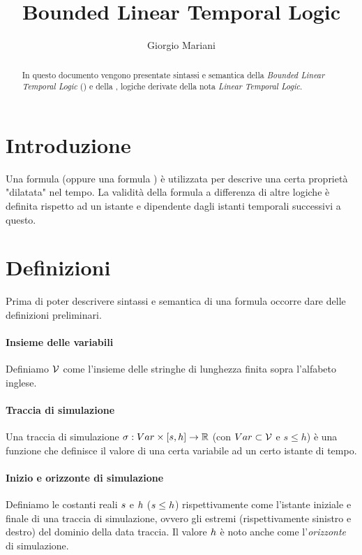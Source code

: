 \documentclass[10pt,a4paper]{article}
\author{Giorgio Mariani}
\date{}
\title{Bounded Linear Temporal Logic}
\begin{document}
	\maketitle{}
	
	\begin{abstract}
	In questo documento vengono presentate sintassi e semantica della \emph{Bounded Linear Temporal Logic} (\BLTL{}) e della \BLTLstar{}, logiche derivate della nota \emph{Linear Temporal Logic}.
	\end{abstract}
	
	\section{Introduzione}
	Una formula \BLTL{} (oppure una formula \BLTLstar) è utilizzata per descrive una certa proprietà "dilatata" nel tempo.
	La validità della formula a differenza di altre logiche è definita rispetto ad un istante e dipendente dagli istanti temporali successivi a questo.

	\section{Definizioni}
	Prima di poter descrivere sintassi e semantica di una formula \BLTL{} occorre dare delle definizioni preliminari.
	
	\begin{multicols}{2}
		\paragraph{Insieme delle variabili}
	Definiamo $\mathcal{V}$ come l'insieme delle stringhe di lunghezza finita sopra l'alfabeto inglese.

	\paragraph{Traccia di simulazione}
	Una traccia di simulazione $\sigma:Var\times[s,h]\to\mathbb{R}$ (con $Var \subset \mathcal{V}$ e $s \le h$) è una funzione che definisce il valore di una certa variabile ad un certo istante di tempo.
	\columnbreak
	\paragraph{Inizio e orizzonte di simulazione}
	Definiamo le costanti reali $s$ e $h$   ($s\le h$) rispettivamente come l'istante iniziale e finale di una traccia di simulazione, ovvero gli estremi (rispettivamente sinistro e destro) del dominio della data traccia. Il valore $h$ è noto anche come l'\emph{orizzonte} di simulazione.
	\end{multicols}
\end{document}
